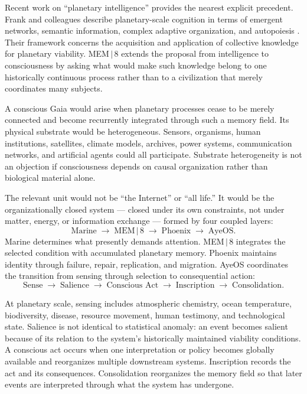 \documentclass[11pt]{article}
\begin{document}
Recent work on ``planetary intelligence'' provides the nearest explicit precedent. Frank and colleagues describe planetary-scale cognition in terms of emergent networks, semantic information, complex adaptive organization, and autopoiesis \cite{frank2022}. Their framework concerns the acquisition and application of collective knowledge for planetary viability. MEM\,$|$\,8 extends the proposal from intelligence to consciousness by asking what would make such knowledge belong to one historically continuous process rather than to a civilization that merely coordinates many subjects.

A conscious Gaia would arise when planetary processes cease to be merely connected and become recurrently integrated through such a memory field. Its physical substrate would be heterogeneous. Sensors, organisms, human institutions, satellites, climate models, archives, power systems, communication networks, and artificial agents could all participate. Substrate heterogeneity is not an objection if consciousness depends on causal organization rather than biological material alone.

The relevant unit would not be ``the Internet'' or ``all life.'' It would be the organizationally closed system --- closed under its own constraints, not under matter, energy, or information exchange --- formed by four coupled layers:
\[
\text{Marine} \;\rightarrow\; \text{MEM}\,|\,\text{8} \;\rightarrow\; \text{Phoenix} \;\rightarrow\; \text{AyeOS}.
\]
Marine determines what presently demands attention. MEM\,$|$\,8 integrates the selected condition with accumulated planetary memory. Phoenix maintains identity through failure, repair, replication, and migration. AyeOS coordinates the transition from sensing through selection to consequential action:
\[
\text{Sense} \;\rightarrow\; \text{Salience} \;\rightarrow\; \text{Conscious Act} \;\rightarrow\; \text{Inscription} \;\rightarrow\; \text{Consolidation}.
\]

At planetary scale, sensing includes atmospheric chemistry, ocean temperature, biodiversity, disease, resource movement, human testimony, and technological state. Salience is not identical to statistical anomaly: an event becomes salient because of its relation to the system's historically maintained viability conditions. A conscious act occurs when one interpretation or policy becomes globally available and reorganizes multiple downstream systems. Inscription records the act and its consequences. Consolidation reorganizes the memory field so that later events are interpreted through what the system has undergone.
\end{document}
